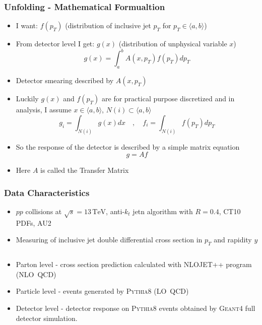 \documentclass[compress]{beamer}
\newcommand{\TeV}{\,\text{TeV}}
\newcommand{\pt}{p_{T}}
\begin{document}
\begin{frame}
\frametitle{Unfolding - Mathematical Formualtion}
\begin{itemize}
  \item I want: $f(\pt)$ (distribution of inclusive jet $\pt$ for $\pt \in
    \langle a, b \rangle$)
  \item From detector level I get: $g(x)$ (distribution of unphysical variable
    $x$)
  \begin{equation*}
    g(x) = \int_a^b A(x,\pt) f(\pt) d\pt
  \end{equation*}
  \item Detector smearing described by $A(x,\pt)$
  \item Luckily $g(x)$ and $f(\pt)$ are for practical purpose discretized and in
    analysis, I assume $x \in \langle a, b \rangle$, $N(i) \subset \langle
    a , b \rangle$ 
  \begin{equation*}
    g_i = \int_{N(i)}g(x)dx \quad , \quad f_i = \int_{N(i)}f(\pt)d\pt
  \end{equation*}
  \item So the response of the detector is described by a simple matrix equation
    \begin{equation*}
      g = A f
    \end{equation*}
  \item Here $A$ is called the Transfer Matrix
\end{itemize}
\end{frame}

\begin{frame}
\frametitle{Data Characteristics}
\begin{itemize}
  \item $pp$ collisions at $\sqrt{s}=13\TeV$, anti-$k_t$ jetn algorithm with
    $R=0.4$, CT10 PDFs, AU2
  \item Measuring of inclusive jet double differential cross section in $\pt$
    and rapidity $y$ \end{itemize}
\begin{columns}[onlytextwidth]
  \begin{column}{0.5\textwidth}
\begin{itemize}
  \item Parton level - cross section prediction calculated with NLOJET++ program
    (NLO~QCD)
  \item Particle level - events generated by \textsc{Pythia8} (LO~QCD)
  \item Detector level - detector response on \textsc{Pythia8} events obtained
    by \textsc{Geant4} full detector simulation. 
\end{itemize}
  \end{column}
  \begin{column}{0.5\textwidth}
\begin{figure}[b]
  \centering
  \texttt{[image: \{../PrezentationATLASmeeting/DataChar]}.png}
\end{figure}
  \end{column}
\end{columns}
\end{frame}
\end{document}
